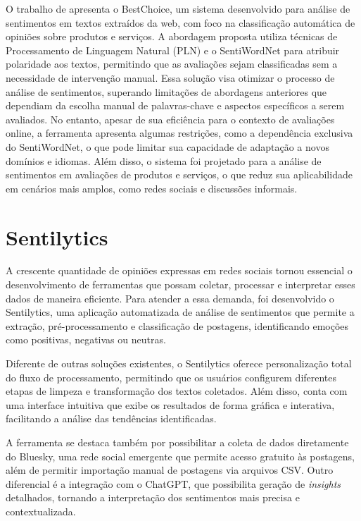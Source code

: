 \documentclass[
	12pt,				%
	oneside,			%
	a4paper,			%
	english,			%
	french,				%
	spanish,			%
	brazil				%
	]{abntex2}
\begin{document}
O trabalho de  apresenta o BestChoice, um
sistema desenvolvido para análise de sentimentos em textos extraídos da
web, com foco na classificação automática de opiniões sobre produtos e
serviços. A abordagem proposta utiliza técnicas de Processamento de
Linguagem Natural (PLN) e o SentiWordNet para atribuir polaridade aos
textos, permitindo que as avaliações sejam classificadas sem a
necessidade de intervenção manual. Essa solução visa otimizar o processo
de análise de sentimentos, superando limitações de abordagens anteriores
que dependiam da escolha manual de palavras-chave e aspectos específicos
a serem avaliados. No entanto, apesar de sua eficiência para o contexto
de avaliações online, a ferramenta apresenta algumas restrições, como a
dependência exclusiva do SentiWordNet, o que pode limitar sua capacidade
de adaptação a novos domínios e idiomas. Além disso, o sistema foi
projetado para a análise de sentimentos em avaliações de produtos e
serviços, o que reduz sua aplicabilidade em cenários mais amplos, como
redes sociais e discussões informais.

\hypertarget{sentilytics}{%
\chapter{Sentilytics}\label{sentilytics}}

A crescente quantidade de opiniões expressas em redes sociais tornou
essencial o desenvolvimento de ferramentas que possam coletar, processar
e interpretar esses dados de maneira eficiente. Para atender a essa
demanda, foi desenvolvido o Sentilytics, uma aplicação automatizada de
análise de sentimentos que permite a extração, pré-processamento e
classificação de postagens, identificando emoções como positivas,
negativas ou neutras.

Diferente de outras soluções existentes, o Sentilytics oferece
personalização total do fluxo de processamento, permitindo que os
usuários configurem diferentes etapas de limpeza e transformação dos
textos coletados. Além disso, conta com uma interface intuitiva que
exibe os resultados de forma gráfica e interativa, facilitando a análise
das tendências identificadas.

A ferramenta se destaca também por possibilitar a coleta de dados
diretamente do Bluesky, uma rede social emergente que permite acesso
gratuito às postagens, além de permitir importação manual de postagens
via arquivos CSV. Outro diferencial é a integração com o ChatGPT, que
possibilita geração de \emph{insights} detalhados, tornando a
interpretação dos sentimentos mais precisa e contextualizada.
\end{document}

